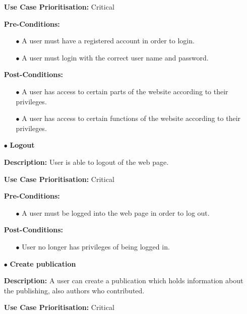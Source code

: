 \documentclass[a4paper,12pt]{article}
\begin{document}
\begin{itemize}
	\textbf{Use Case Prioritisation:} Critical\newline
	
	\textbf{Pre-Conditions:}
	\begin{itemize}
		\item[$\bullet$]A user must have a registered account in order to login.
		\item[$\bullet$]A user must login with the correct user name and password.
		\\
	\end{itemize}
	\textbf{Post-Conditions: }
	\begin{itemize}
		\item[$\bullet$]A user has access to certain parts of the website according to their privileges.
		\item[$\bullet$]A user has access to certain functions of the website according to their privileges.
		\\
	\end{itemize}
	\item[$\bullet$]\textbf{Logout}\newline

	\textbf{Description:} User is able to logout of the web page.\newline
	
	\textbf{Use Case Prioritisation:} Critical\newline

	\textbf{Pre-Conditions:}
	\begin{itemize}
		\item[$\bullet$]A user must be logged into the web page in order to log out.
		\\
	\end{itemize}
	\textbf{Post-Conditions: }
	\begin{itemize}
		\item[$\bullet$]User no longer has privileges of being logged in.
		\\
	\end{itemize}
	\newpage
	\item[$\bullet$]\textbf{Create publication}\newline

	\textbf{Description:} A user can create a publication which holds information about the publishing, also authors who contributed.\newline
	
	\textbf{Use Case Prioritisation:} Critical\newline


\end{itemize}
\end{document}
